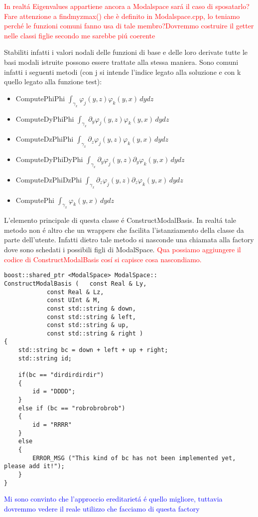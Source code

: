 \textcolor{red}{In realt\'a Eigenvalues appartiene ancora a Modalspace sar\'a il caso di sposatarlo?Fare attenzione a findmyzmax() che è definito in Modalspace.cpp, lo teniamo perch\'e le funzioni comuni fanno usa di tale membro?Dovremmo costruire il getter nelle classi figlie secondo me sarebbe pi\'u coerente}

Stabiliti infatti i valori nodali delle funzioni di base e delle loro derivate tutte le basi modali istruite possono essere trattate alla stessa maniera. Sono comuni infatti i seguenti metodi (con j si intende l'indice legato alla soluzione e con k quello legato alla funzione test):
\begin{itemize}
\item ComputePhiPhi $\int_{\gamma_x}\varphi_j(y,z)\varphi_k(y,x) \,dydz$
\item ComputeDyPhiPhi $\int_{\gamma_x} \partial_y \varphi_j(y,z)\varphi_k(y,x) \,dydz$
\item ComputeDzPhiPhi
$\int_{\gamma_x} \partial_z \varphi_j(y,z)\varphi_k(y,x) \,dydz$
\item ComputeDyPhiDyPhi $\int_{\gamma_x} \partial_y \varphi_j(y,z)\partial_y\varphi_k(y,x) \,dydz$
\item ComputeDzPhiDzPhi
$\int_{\gamma_x} \partial_z \varphi_j(y,z)\partial_z\varphi_k(y,x) \,dydz$
\item ComputePhi
$\int_{\gamma_x} \varphi_k(y,x) \,dydz$
\end{itemize}

L'elemento principale di questa classe \'e ConstructModalBasis. In realt\'a tale metodo non \'e altro che un wrappers che facilita l'istanziamento della classe da parte dell'utente. Infatti dietro tale metodo si nasconde una chiamata alla factory dove sono schedati i possibili figli di ModalSpace.
 \textcolor{red}{Qua possiamo aggiungere il codice di ConstructModalBasis cos\'i si capisce cosa nascondiamo.}


\begin{lstlisting}
boost::shared_ptr <ModalSpace> ModalSpace::
ConstructModalBasis ( 	const Real & Ly,
 			const Real & Lz, 
 			const UInt & M, 
 			const std::string & down, 
 			const std::string & left, 
 			const std::string & up, 
 			const std::string & right )
{
	std::string bc = down + left + up + right;
	std::string id;

	if(bc == "dirdirdirdir")
	{
		id = "DDDD";
	}
	else if (bc == "robrobrobrob")
	{
		id = "RRRR"
	}
	else
	{
		ERROR_MSG ("This kind of bc has not been implemented yet, please add it!");
	}
}
\end{lstlisting} 
 \textcolor{blue}{Mi sono convinto che l'approccio ereditariet\'a \'e quello migliore, tuttavia dovremmo vedere il reale utilizzo che facciamo di questa factory}
 
